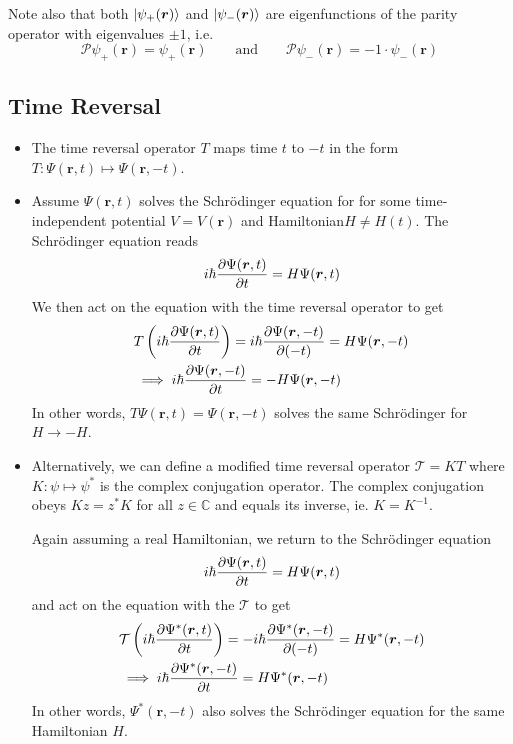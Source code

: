 \documentclass[11pt, a4paper]{article}
\newcommand{\eqtext}[1]{\qquad \text{#1} \qquad}
\newcommand{\Schro}{Schr\"{o}dinger\xspace}
\newcommand{\Ham}{Hamiltonian\xspace}
\renewcommand{\vec}[1]{\bm{#1}} %
\renewcommand{\r}{\vec{r}}  %
\newcommand{\T}{\mathcal{T}}  %
\newcommand{\Par}{\mathcal{P}}  %
\newcommand{\p}{\psi}  %
\renewcommand{\P}{\Psi}  %
\renewcommand{\k}[1]{\ket{#1}}
\begin{document}
\begin{itemize}
	Note also that both $  \ket{\p_{+}(\r)} $ and $ \k{\p_{-}(\r)} $ are eigenfunctions of the parity operator with eigenvalues $ \pm 1 $, i.e.
	\begin{equation*}
		\Par \p_{+}(\r) =  \p_{+}(\r) \eqtext{and} \Par \p_{-}(\r) =  -1 \cdot \p_{-}(\r)
	\end{equation*}
	
\end{itemize}

\subsection{Time Reversal}
\begin{itemize}
	\item The time reversal operator $ T $ maps time $ t $ to $ -t $ in the form $ T: \P(\r, t) \mapsto \P(\r, -t) $.
	
	\item Assume $ \P(\r, t) $ solves the \Schro equation for for some time-independent potential $ V = V(\r) $ and \Ham $ H \neq H(t) $. The \Schro equation reads
	\begin{equation*}
		i \hbar \pdv{\P(\r, t)}{t} = H \P(\r, t)
	\end{equation*}
	We then act on the equation with the time reversal operator to get
	\begin{align*}
		& T\left(i \hbar \pdv{\P(\r, t)}{t}\right) = i \hbar \pdv{\P(\r, -t)}{(-t)} = H \P(\r, -t)  \\
		& \implies i \hbar \pdv{\P(\r, -t)}{t} = -H \P(\r, -t) 
	\end{align*}
	In other words, $ T\P(\r, t) = \P(\r, -t) $ solves the same \Schro for $ H \to - H $.
	
	\item Alternatively, we can define a modified time reversal operator $ \T = KT $ where $ K : \psi \mapsto \psi^{*} $ is the complex conjugation operator. The complex conjugation obeys $ K z = z^{*}K $ for all $ z \in \mathbb{C} $ and equals its inverse, ie. $ K = K^{-1} $. 
	
	Again assuming a real Hamiltonian, we return to the \Schro equation
	\begin{equation*}
		i \hbar \pdv{\P(\r, t)}{t} = H \P(\r, t) 
	\end{equation*}
	and act on the equation with the $ \T $ to get
	\begin{align*}
		& \T\left(i \hbar \pdv{\P^{*}(\r, t)}{t}\right) = -i \hbar \pdv{\P^{*}(\r, -t)}{(-t)} = H \P^{*}(\r, -t) \\
		& \implies i \hbar \pdv{\P^{*}(\r, -t)}{t} = H \P^{*}(\r, -t) 
	\end{align*}
	In other words, $ \P^{*}(\r, -t) $ also solves the \Schro equation for the same Hamiltonian $ H $. 
	

\end{itemize}
\end{document}
